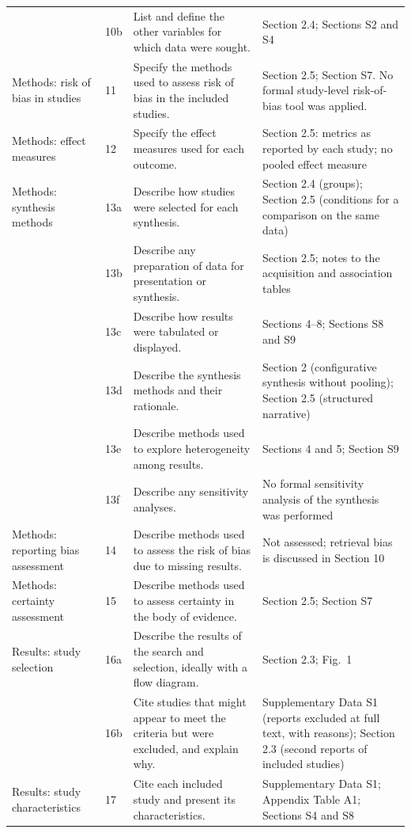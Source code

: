 \documentclass[a4paper,11pt]{article}
\begin{document}
\begin{footnotesize}
\begin{longtable}{@{}L{3.0cm}L{0.8cm}L{6.4cm}L{\dimexpr\linewidth-10.2cm-6\tabcolsep\relax}@{}}
 & 10b & List and define the other variables for which data were sought. & Section 2.4; Sections S2 and S4\\
Methods: risk of bias in studies & 11 & Specify the methods used to assess risk of bias in the included studies. & Section 2.5; Section S7. No formal study-level risk-of-bias tool was applied.\\
Methods: effect measures & 12 & Specify the effect measures used for each outcome. & Section 2.5: metrics as reported by each study; no pooled effect measure\\
Methods: synthesis methods & 13a & Describe how studies were selected for each synthesis. & Section 2.4 (groups); Section 2.5 (conditions for a comparison on the same data)\\
 & 13b & Describe any preparation of data for presentation or synthesis. & Section 2.5; notes to the acquisition and association tables\\
 & 13c & Describe how results were tabulated or displayed. & Sections 4--8; Sections S8 and S9\\
 & 13d & Describe the synthesis methods and their rationale. & Section 2 (configurative synthesis without pooling); Section 2.5 (structured narrative)\\
 & 13e & Describe methods used to explore heterogeneity among results. & Sections 4 and 5; Section S9\\
 & 13f & Describe any sensitivity analyses. & No formal sensitivity analysis of the synthesis was performed\\
Methods: reporting bias assessment & 14 & Describe methods used to assess the risk of bias due to missing results. & Not assessed; retrieval bias is discussed in Section 10\\
Methods: certainty assessment & 15 & Describe methods used to assess certainty in the body of evidence. & Section 2.5; Section S7\\
Results: study selection & 16a & Describe the results of the search and selection, ideally with a flow diagram. & Section 2.3; Fig.~1\\
 & 16b & Cite studies that might appear to meet the criteria but were excluded, and explain why. & Supplementary Data S1 (reports excluded at full text, with reasons); Section 2.3 (second reports of included studies)\\
Results: study characteristics & 17 & Cite each included study and present its characteristics. & Supplementary Data S1; Appendix Table A1; Sections S4 and S8\\

\end{longtable}
\end{footnotesize}
\end{document}
